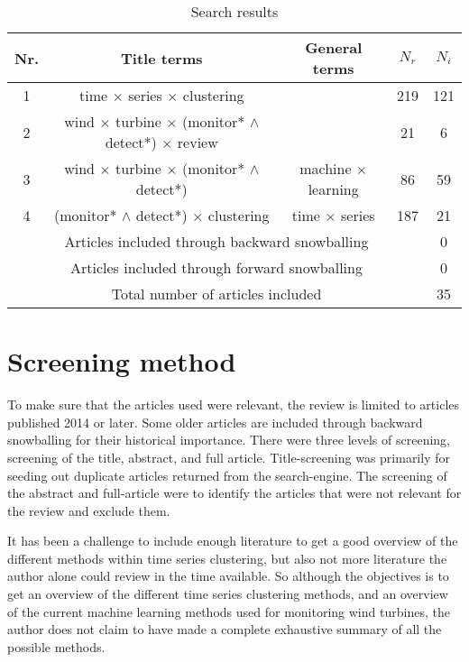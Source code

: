 \begin{table}[h]
    \centering
    \begin{tabular}{ |c|c|c|c|c| } 
    \hline
    Nr. & Title terms & General terms & $N_r$ & $N_i$ \\
    \hline
    \hline
    1 & time $\times$ series $\times$ clustering &  & 219 & 121 \\ 
    \hline
    2 & wind $\times$ turbine $\times$ (monitor* $\wedge{}$ detect*) $\times$ review &  & 21 & 6 \\
    \hline
    3 & wind $\times$ turbine $\times$ (monitor* $\wedge{}$ detect*) & machine $\times$ learning & 86 & 59 \\ 
    \hline
    4 & (monitor* $\wedge{}$ detect*) $\times$ clustering & time $\times$ series & 187 & 21 \\
    \hline
    \multicolumn{4}{|c|}{Articles included through backward snowballing} & 0 \\
    \hline
    \multicolumn{4}{|c|}{Articles included through forward snowballing} & 0 \\
    \hline
    \hline
    \multicolumn{4}{|c|}{Total number of articles included} & 35 \\
    \hline
    \end{tabular}
    \caption{Search results}
    \label{tab:search_results}
\end{table}

\section{Screening method}
To make sure that the articles used were relevant, the review is limited to articles published 2014 or later. Some older articles are included through backward snowballing for their historical importance. There were three levels of screening, screening of the title, abstract, and full article. Title-screening was primarily for seeding out duplicate articles returned from the search-engine. The screening of the abstract and full-article were to identify the articles that were not relevant for the review and exclude them. \bigskip

It has been a challenge to include enough literature to get a good overview of the different methods within time series clustering, but also not more literature the author alone could review in the time available. So although the objectives is to get an overview of the different time series clustering methods, and an overview of the current machine learning methods used for monitoring wind turbines, the author does not claim to have made a complete exhaustive summary of all the possible methods. \bigskip

